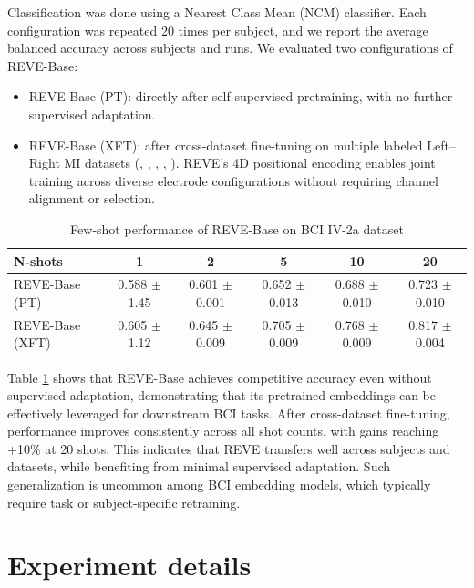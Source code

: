 \documentclass{article}
\begin{document}
Classification was done using a Nearest Class Mean (NCM) classifier. Each configuration was repeated 20 times per subject, and we report the average balanced accuracy across subjects and runs.
We evaluated two configurations of REVE-Base:
\begin{itemize}
    \item REVE-Base (PT): directly after self-supervised pretraining, with no further supervised adaptation.
    \item REVE-Base (XFT): after cross-dataset fine-tuning on multiple labeled Left–Right MI datasets (\citep{Schirrmeister2017}, \citep{Cho2017}, \citep{goldberger2000physiobank}, \citep{Lee2019}, \citep{Weibo2014}). REVE’s 4D positional encoding enables joint training across diverse electrode configurations without requiring channel alignment or selection.
\end{itemize}



\begin{table}[!ht]
    \small
    \centering
    \caption{Few-shot performance of REVE-Base on BCI IV-2a dataset}
    \begin{tabular}{lccccc}
    \toprule
        \textbf{N-shots} & \textbf{1} & \textbf{2} & \textbf{5} & \textbf{10} & \textbf{20} \\ \midrule
        REVE-Base (PT) & 0.588 $\pm$ 1.45 & 0.601 $\pm$ 0.001 & 0.652 $\pm$ 0.013 & 0.688 $\pm$ 0.010 & 0.723 $\pm$ 0.010 \\ \midrule
        REVE-Base (XFT) & 0.605 $\pm$ 1.12 & 0.645 $\pm$ 0.009 & 0.705 $\pm$ 0.009 & 0.768 $\pm$ 0.009 & 0.817 $\pm$ 0.004 \\ \midrule
    \end{tabular}
    \label{tab:few_shot_performance}
\end{table}

Table \ref{tab:few_shot_performance} shows that REVE-Base achieves competitive accuracy even without supervised adaptation, demonstrating that its pretrained embeddings can be effectively leveraged for downstream BCI tasks. After cross-dataset fine-tuning, performance improves consistently across all shot counts, with gains reaching +10\% at 20 shots. This indicates that REVE transfers well across subjects and datasets, while benefiting from minimal supervised adaptation. Such generalization is uncommon among BCI embedding models, which typically require task or subject-specific retraining.

\section{Experiment details}
\end{document}
